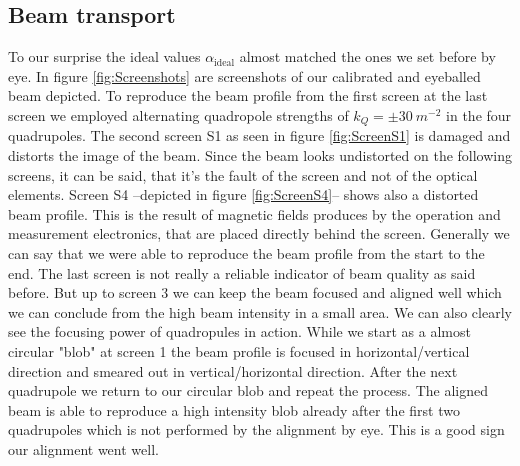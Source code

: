 \documentclass[11pt,a4paper,notitlepage]{scrartcl}
\begin{document}
\subsection{Beam transport}
To our surprise the ideal values $\alpha_\text{ideal}$ almost matched the ones we set before by eye. In figure \ref{fig:Screenshots} are screenshots of our calibrated and eyeballed beam depicted. To reproduce the beam profile from the first screen at the last screen we employed alternating quadropole strengths of $k_Q=\pm\SI{30}{m^{-2}}$ in the four quadrupoles. The second screen S1 as seen in figure \ref{fig:ScreenS1} is damaged and distorts the image of the beam. Since the beam looks undistorted on the following screens, it can be said, that it's the fault of the screen and not of the optical elements. Screen S4 --depicted in figure \ref{fig:ScreenS4}-- shows also a distorted beam profile. This is the result of magnetic fields produces by the operation and measurement electronics, that are placed directly behind the screen. Generally we can say that we were able to reproduce the beam profile from the start to the end. The last screen is not really a reliable indicator of beam quality as said before. But up to screen 3 we can keep the beam focused and aligned well which we can conclude from the high beam intensity in a small area. We can also clearly see the focusing power of quadropules in action. While we start as a almost circular "blob" at screen 1 the beam profile is focused in horizontal/vertical direction and smeared out in vertical/horizontal direction. After the next quadrupole we return to our circular blob and repeat the process. The aligned beam is able to reproduce a high intensity blob already after the first two quadrupoles which is not performed by the alignment by eye. This is a good sign our alignment went well.    
\end{document}
